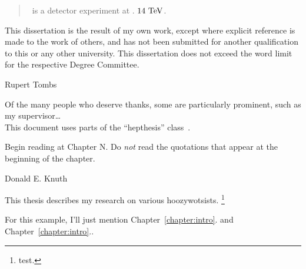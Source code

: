 

\begin{abstract}
\atlas\ is a detector experiment at \cern. $14~\eV[T]$.
\end{abstract}


\begin{declaration}
This dissertation is the result of my own work, except where explicit
reference is made to the work of others, and has not been submitted
for another qualification to this or any other university. This
dissertation does not exceed the word limit for the respective Degree
Committee.
\vspace*{1cm}
\begin{flushright}
Rupert Tombs
\end{flushright}
\end{declaration}


\begin{acknowledgements}
Of the many people who deserve thanks, some are particularly prominent,
such as my supervisor\dots
\\
This document uses parts of the ``hepthesis'' class~\cite{hepthesis}.
\end{acknowledgements}


\begin{preface}
\epigraph{%
Begin reading at Chapter N. Do \emph{not} read the quotations
that appear at the beginning of the chapter.%
}%
{Donald E. Knuth~\cite{knuth1975art}}


This thesis describes my research on various hoozywotsists.%
\footnote{test.}

\noindent
For this example, I'll just mention Chapter~\ref{chapter:intro}.
and Chapter~\ref{chapter:intro}..
\end{preface}


\tableofcontents


\thispagestyle{empty}

